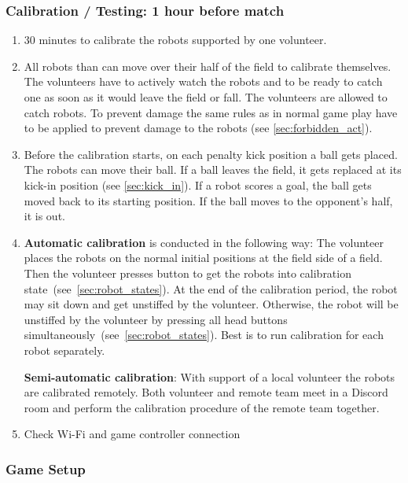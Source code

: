 \subsubsection{Calibration / Testing: 1 hour before match}
    \begin{enumerate}
        \item 30 minutes to calibrate the robots supported by one volunteer.
        \item All robots than can move over their half of the field to calibrate themselves. The volunteers have to actively watch the robots and to be ready to catch one as soon as it would leave the field or fall. The volunteers are allowed to catch robots. To prevent damage the same rules as in normal game play have to be applied to prevent damage to the robots (see \ref{sec:forbidden_act}).
        \item Before the calibration starts, on each penalty kick position a ball gets placed. The robots can move their ball. If a ball leaves the field, it gets replaced at its kick-in position (see \ref{sec:kick_in}). If a robot scores a goal, the ball gets moved back to its starting position. If the ball moves to the opponent's half, it is out.
        \item \textbf{Automatic calibration} is conducted in the following way: The volunteer places the robots on the normal initial positions at the field side of a field. Then the volunteer presses button to get the robots into calibration state~(see~\ref{sec:robot_states}). At the end of the calibration period, the robot may sit down and get unstiffed by the volunteer. Otherwise, the robot will be unstiffed by the volunteer by pressing all head buttons simultaneously~(see~\ref{sec:robot_states}). Best is to run calibration for each robot separately.
     
        \textbf{Semi-automatic calibration}: With support of a local volunteer the robots are calibrated remotely. Both volunteer and remote team meet in a Discord room and perform the calibration procedure of the remote team together.

        \item  Check Wi-Fi and game controller connection
    \end{enumerate}

\subsubsection{Game Setup}

